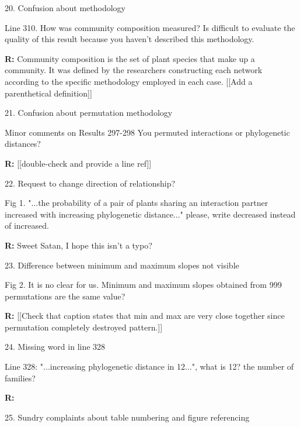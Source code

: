 \documentclass[12pt]{letter}
\newenvironment{refquote}{\bigskip \begin{it}}{\end{it}\smallskip}
\begin{document}
	20. Confusion about methodology

		\begin{refquote}
			Line 310. How was community composition measured? Is difficult to evaluate the quality of this result because you haven't described this methodology.
		\end{refquote}

		\textbf{R:} Community composition is the set of plant species that make up a community. It was defined by the researchers constructing each network according to the specific methodology employed in each case. [[Add a parenthetical definition]]


	21. Confusion about permutation methodology

		\begin{refquote}
			Minor comments on Results
			297-298 You permuted interactions or phylogenetic distances?
		\end{refquote}


		\textbf{R:} [[double-check and provide a line ref]]


	22. Request to change direction of relationship?
		\begin{refquote}
			Fig 1. "...the probability of a pair of plants sharing an interaction partner increased with increasing phylogenetic distance..." please, write decreased instead of increased.
		\end{refquote}


		\textbf{R:} Sweet Satan, I hope this isn't a typo?


	23. Difference between minimum and maximum slopes not visible

		\begin{refquote}
			Fig 2. It is no clear for us. Minimum and maximum slopes obtained from 999 permutations are the same value?
		\end{refquote}


		\textbf{R:} [[Check that caption states that min and max are very close together since permutation completely destroyed pattern.]]


	24. Missing word in line 328

		\begin{refquote}
			Line  328: "...increasing phylogenetic distance in 12...", what is 12? the number of families?
		\end{refquote}

		\textbf{R:}


	25. Sundry complaints about table numbering and figure referencing
\end{document}
